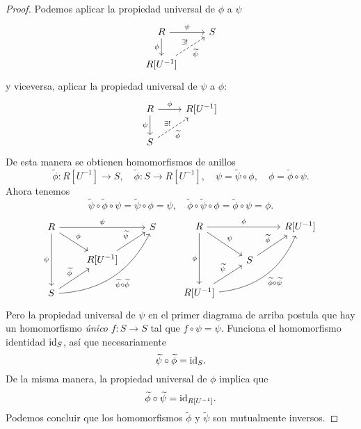 \begin{proposicion}
  \begin{proof}
    Podemos aplicar la propiedad universal de $\phi$ a $\psi$
    \[ \begin{tikzcd}
        R \ar{r}{\psi}\ar{d}[swap]{\phi} & S \\
        R [U^{-1}] \ar[dashed]{ur}{\exists !}[swap]{\widetilde{\psi}}
      \end{tikzcd} \]
    y viceversa, aplicar la propiedad universal de $\psi$ a $\phi$:
    \[ \begin{tikzcd}
        R \ar{r}{\phi}\ar{d}[swap]{\psi} & R [U^{-1}] \\
        S \ar[dashed]{ur}{\exists !}[swap]{\widetilde{\phi}}
      \end{tikzcd} \]
    De esta manera se obtienen homomorfismos de anillos
    \[ \widetilde{\phi}\colon R [U^{-1}]\to S, \quad
       \widetilde{\phi}\colon S\to R [U^{-1}], \quad
       \psi = \widetilde{\psi}\circ \phi, \quad
       \phi = \widetilde{\phi}\circ\psi. \]
    Ahora tenemos
    \[ \widetilde{\psi}\circ\widetilde{\phi}\circ \psi =
       \widetilde{\psi}\circ\phi = \psi,
       \quad
       \widetilde{\phi}\circ\widetilde{\psi}\circ \phi =
       \widetilde{\phi}\circ\psi = \phi. \]
    \[ \begin{tikzcd}
        R \ar{rr}{\psi}\ar{dd}[swap]{\psi}\ar{dr}{\phi} & & S \\
        & R [U^{-1}]\ar{ur}{\widetilde{\psi}} \\
        S \ar[bend right]{uurr}[swap]{\widetilde{\psi}\circ \widetilde{\phi}}\ar{ur}{\widetilde{\phi}}
      \end{tikzcd} \quad\quad \begin{tikzcd}
        R \ar{rr}{\phi}\ar{dd}[swap]{\phi}\ar{dr}{\psi} & & R [U^{-1}] \\
        & S\ar{ur}{\widetilde{\phi}} \\
        R [U^{-1}] \ar[bend right]{uurr}[swap]{\widetilde{\phi}\circ \widetilde{\psi}}\ar{ur}{\widetilde{\psi}}
      \end{tikzcd} \]
    Pero la propiedad universal de $\psi$ en el primer diagrama de arriba
    postula que hay un homomorfismo \emph{único} $f\colon S\to S$ tal que
    $f\circ\psi = \psi$. Funciona el homomorfismo identidad $\mathrm{id}_{S}$, así que
    necesariamente
    $$\widetilde{\psi}\circ\widetilde{\phi} = \mathrm{id}_{S}.$$
    De la misma manera, la propiedad universal de $\phi$ implica que
    $$\widetilde{\phi}\circ\widetilde{\psi} = \mathrm{id}_{R[U^{-1}]}.$$
    Podemos concluir que los homomorfismos $\widetilde{\phi}$ y
    $\widetilde{\psi}$ son mutualmente inversos.
  \end{proof}
\end{proposicion}

